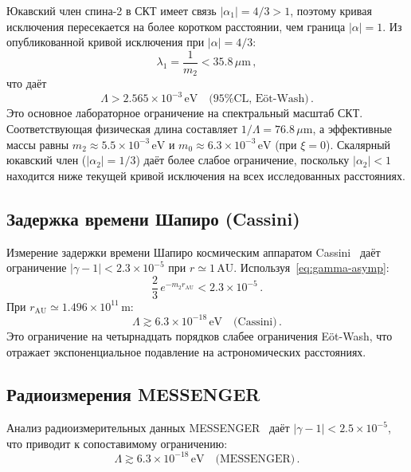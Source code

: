 \documentclass[aps,prd,twocolumn,superscriptaddress,nofootinbib,floatfix]{revtex4-2}
\begin{document}
Юкавский член спина-2 в СКТ имеет связь $|\alpha_1| = 4/3 > 1$,
поэтому кривая исключения пересекается на более коротком расстоянии,
чем граница $|\alpha| = 1$. Из опубликованной кривой исключения при
$|\alpha| = 4/3$:
\begin{equation}
  \lambda_1 = \frac{1}{m_2} < 35.8\,\mu\mathrm{m}\,,
  \label{eq:eotwash-range}
\end{equation}
что даёт
\begin{equation}
  \boxed{
    \Lambda > 2.565 \times 10^{-3}\,\mathrm{eV}
    \quad \text{(95\% CL, E\"ot-Wash)}\,.}
  \label{eq:eotwash}
\end{equation}
Это основное лабораторное ограничение на спектральный масштаб СКТ.
Соответствующая физическая длина составляет
$1/\Lambda = 76.8\,\mu\mathrm{m}$, а эффективные массы равны
$m_2 \approx 5.5 \times 10^{-3}\,\mathrm{eV}$ и
$m_0 \approx 6.3 \times 10^{-3}\,\mathrm{eV}$ (при $\xi = 0$).
Скалярный юкавский член ($|\alpha_2| = 1/3$) даёт более слабое
ограничение, поскольку $|\alpha_2| < 1$ находится ниже текущей
кривой исключения на всех исследованных расстояниях.

\subsection{Задержка времени Шапиро (Cassini)}

Измерение задержки времени Шапиро космическим аппаратом
Cassini~\cite{Bertotti:2003} даёт ограничение
$|\gamma - 1| < 2.3 \times 10^{-5}$ при
$r \simeq 1\,\mathrm{AU}$.
Используя~\eqref{eq:gamma-asymp}:
\begin{equation}
  \frac{2}{3}\,e^{-m_2 r_\mathrm{AU}} < 2.3 \times 10^{-5}\,.
\end{equation}
При $r_\mathrm{AU} \simeq 1.496 \times 10^{11}\,\mathrm{m}$:
\begin{equation}
  \Lambda \gtrsim 6.3 \times 10^{-18}\,\mathrm{eV}
  \quad \text{(Cassini)}\,.
  \label{eq:cassini}
\end{equation}
Это ограничение на четырнадцать порядков слабее ограничения E\"ot-Wash,
что отражает экспоненциальное подавление на астрономических расстояниях.

\subsection{Радиоизмерения MESSENGER}

Анализ радиоизмерительных данных MESSENGER~\cite{Verma:2014} даёт
$|\gamma - 1| < 2.5 \times 10^{-5}$, что приводит к сопоставимому
ограничению:
\begin{equation}
  \Lambda \gtrsim 6.3 \times 10^{-18}\,\mathrm{eV}
  \quad \text{(MESSENGER)}\,.
  \label{eq:messenger}
\end{equation}
\end{document}
